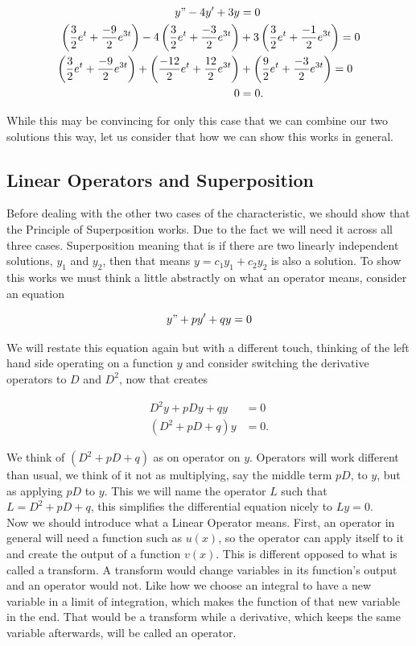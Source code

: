 \documentclass[12pt]{article}
\begin{document}
\begin{align*}
    y"-4y'+3y &= 0 \\
    \left(\frac{3}{2}e^t+\frac{-9}{2}e^{3t}\right)-4\left(\frac{3}{2}e^t+\frac{-3}{2}e^{3t}\right)&+3\left(\frac{3}{2}e^t+\frac{-1}{2}e^{3t}\right) = 0 \\
    \left(\frac{3}{2}e^t+\frac{-9}{2}e^{3t}\right)+\left(\frac{-12}{2}e^t+\frac{12}{2}e^{3t}\right)&+\left(\frac{9}{2}e^t+\frac{-3}{2}e^{3t}\right) = 0 \\
    0 &= 0.
\end{align*}

While this may be convincing for only this case that we can combine our two solutions this way, let us consider that how we can show this works in general.

\subsection{Linear Operators and Superposition}

Before dealing with the other two cases of the characteristic, we should show that the Principle of Superposition works. Due to the fact we will need it across all three cases. Superposition meaning that is if there are two linearly independent solutions, $y_1$ and $y_2$, then that means $y=c_1y_1+c_2y_2$ is also a solution. To show this works we must think a little abstractly on what an operator means, consider an equation

\begin{equation*}
    y"+py'+qy=0
\end{equation*}

We will restate this equation again but with a different touch, thinking of the left hand side operating on a function $y$ and consider switching the derivative operators to $D$ and $D^2$, now that creates

\begin{align*}
    D^2y+pDy+qy &= 0 \\
    (D^2+pD+q)y &= 0.
\end{align*}

We think of $(D^2+pD+q)$ as on operator on $y$. Operators will work different than usual, we think of it not as multiplying, say the middle term $pD$, to $y$, but as applying $pD$ to $y$. This we will name the operator $L$ such that $L=D^2+pD+q$, this simplifies the differential equation nicely to $Ly=0$. \\

Now we should introduce what a Linear Operator means. First, an operator in general will need a function such as $u(x)$, so the operator can apply itself to it and create the output of a function $v(x)$. This is different opposed to what is called a transform. A transform would change variables in its function's output and an operator would not. Like how we choose an integral to have a new variable in a limit of integration, which makes the function of that new variable in the end. That would be a transform while a derivative, which keeps the same variable afterwards, will be called an operator. \\
\end{document}
